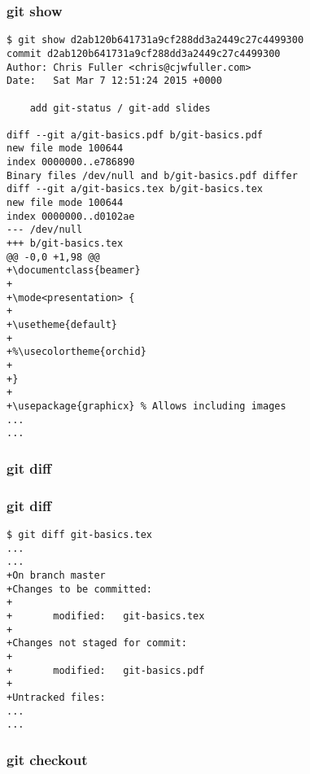 \documentclass{beamer}
\begin{document}

\begin{frame}[fragile]
\frametitle{git show}
	\tiny
	\begin{verbatim}
$ git show d2ab120b641731a9cf288dd3a2449c27c4499300
commit d2ab120b641731a9cf288dd3a2449c27c4499300
Author: Chris Fuller <chris@cjwfuller.com>
Date:   Sat Mar 7 12:51:24 2015 +0000

    add git-status / git-add slides

diff --git a/git-basics.pdf b/git-basics.pdf
new file mode 100644
index 0000000..e786890
Binary files /dev/null and b/git-basics.pdf differ
diff --git a/git-basics.tex b/git-basics.tex
new file mode 100644
index 0000000..d0102ae
--- /dev/null
+++ b/git-basics.tex
@@ -0,0 +1,98 @@
+\documentclass{beamer}
+
+\mode<presentation> {
+
+\usetheme{default}
+
+%\usecolortheme{orchid}
+
+}
+
+\usepackage{graphicx} % Allows including images
...
...
	\end{verbatim}
\end{frame}



\begin{frame}
\frametitle{git diff}

\end{frame}


\begin{frame}[fragile]
\frametitle{git diff}
	\tiny
	\begin{verbatim}
$ git diff git-basics.tex
...
...
+On branch master
+Changes to be committed:
+
+       modified:   git-basics.tex
+
+Changes not staged for commit:
+
+       modified:   git-basics.pdf
+
+Untracked files:
...
...
	\end{verbatim}
\end{frame}



\begin{frame}
\frametitle{git checkout}

\end{frame}

\end{document}
